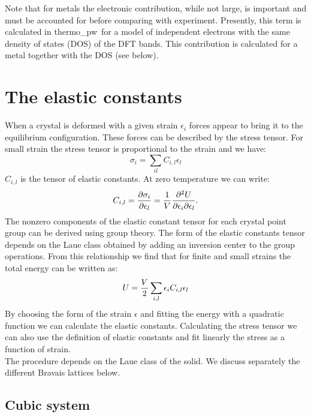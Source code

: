 \documentclass[12pt,a4paper]{article}
\def\tpw{{\sc thermo\_pw}}
\begin{document}
Note that for metals the electronic contribution, while not large, is important 
and must be accounted for before comparing with experiment. Presently,
this term is calculated in \tpw\ for a model of independent electrons with
the same density of states (DOS) of the DFT bands. This contribution is 
calculated for a metal together with the DOS (see below).

\newpage
\section{\color{coral}The elastic constants}

When a crystal is deformed with a given strain $\epsilon_i$ forces
appear to bring it to the equilibrium configuration. These
forces can be described by the stress tensor. For small strain the 
stress tensor is proportional to the strain and we have:
\begin{equation}
\sigma_{i} =\sum_{il} C_{i,l} \epsilon_l 
\end{equation}
$C_{i,l}$ is the tensor of elastic constants. 
At zero temperature we can write:
\begin{equation}
C_{i,l}= {\partial \sigma_i \over \partial \epsilon_{l}}=
{1 \over V}{\partial^2 U \over \partial \epsilon_i \partial \epsilon_l}
.
\end{equation}
The nonzero components of the elastic constant tensor for each crystal point
group can be derived using group theory. The form of the elastic constants
tensor depends on the Laue class obtained by adding an inversion center to
the group operations. From this relationship we find that for finite
and small strains the total energy can be written as:
\begin{equation}
U= {V \over 2} \sum_{i,l} \epsilon_i C_{i,l} \epsilon_l
\end{equation}
By choosing the form of the strain $\epsilon$ and fitting the
energy with a quadratic function we can calculate the elastic constants.
Calculating the stress tensor we can also use the definition
of elastic constants and fit linearly the stress as a function of strain. \\
The procedure depends on the Laue class of the solid. We discuss separately
the different Bravais lattices below.

\subsection{\color{web-blue}Cubic system}
\end{document}
